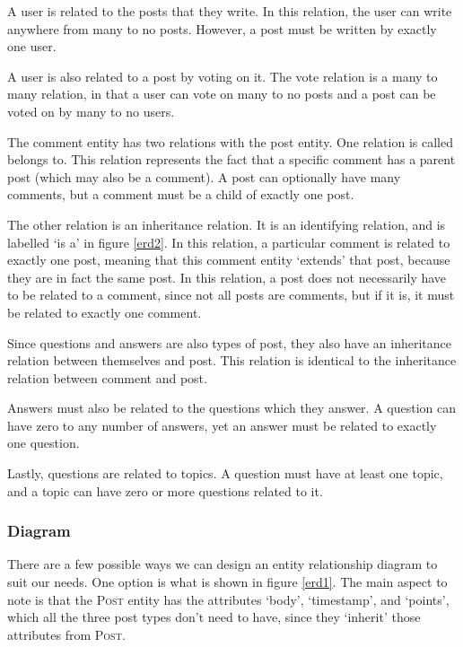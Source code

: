 A user is related to the posts that they write. In this relation, the user can write anywhere from many to no posts. However, a post must be written by exactly one user.

A user is also related to a post by voting on it. The vote relation is a many to many relation, in that a user can vote on many to no posts and a post can be voted on by many to no users.

The comment entity has two relations with the post entity. One relation is called belongs to. This relation represents the fact that a specific comment has a parent post (which may also be a comment). A post can optionally have many comments, but a comment must be a child of exactly one post.

The other relation is an inheritance relation. It is an identifying relation, and is labelled `is a' in figure \ref{erd2}. In this relation, a particular comment is related to exactly one post, meaning that this comment entity `extends' that post, because they are in fact the same post. In this relation, a post does not necessarily have to be related to a comment, since not all posts are comments, but if it is, it must be related to exactly one comment.

Since questions and answers are also types of post, they also have an inheritance relation between themselves and post. This relation is identical to the inheritance relation between comment and post.

Answers must also be related to the questions which they answer. A question can have zero to any number of answers, yet an answer must be related to exactly one question.

Lastly, questions are related to topics. A question must have at least one topic, and a topic can have zero or more questions related to it.

\subsubsection{Diagram}

There are a few possible ways we can design an entity relationship diagram to suit our needs. One option is what is shown in figure \ref{erd1}. The main aspect to note is that the \textsc{Post} entity has the attributes `body', `timestamp', and `points', which all the three post types don't need to have, since they `inherit' those attributes from \textsc{Post}.

